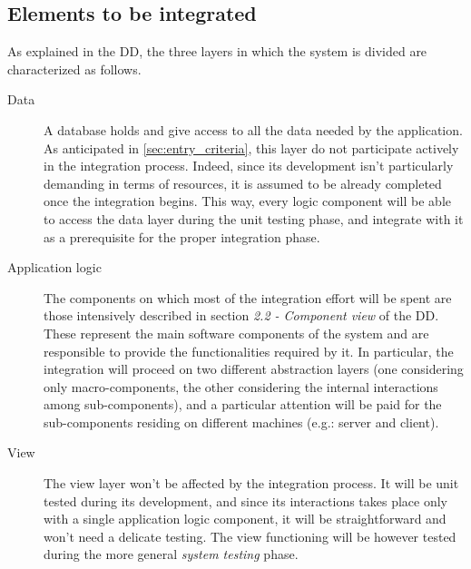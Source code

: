 \subsection{Elements to be integrated}
	As explained in the DD, the three layers in which the system is divided are characterized as follows.
	\begin{description}
		\item[Data] A database holds and give access to all the data needed by the application. As anticipated in \autoref{sec:entry_criteria}, this layer do not participate actively in the integration process. Indeed, since its development isn't particularly demanding in terms of resources, it is assumed to be already completed once the integration begins. This way, every logic component will be able to access the data layer during the unit testing phase, and integrate with it as a prerequisite for the proper integration phase.
		\item[Application logic] The components on which most of the integration effort will be spent are those intensively described in section \textit{2.2 - Component view} of the DD. These represent the main software components of the system and are responsible to provide the functionalities required by it. In particular, the integration will proceed on two different abstraction layers (one considering only macro-components, the other considering the internal interactions among sub-components), and a particular attention will be paid for the sub-components residing on different machines (e.g.: server and client).
		\item[View] The view layer won't be affected by the integration process. It will be unit tested during its development, and since its interactions takes place only with a single application logic component, it will be straightforward and won't need a delicate testing. The view functioning will be however tested during the more general \textit{system testing} phase. %
	\end{description}

